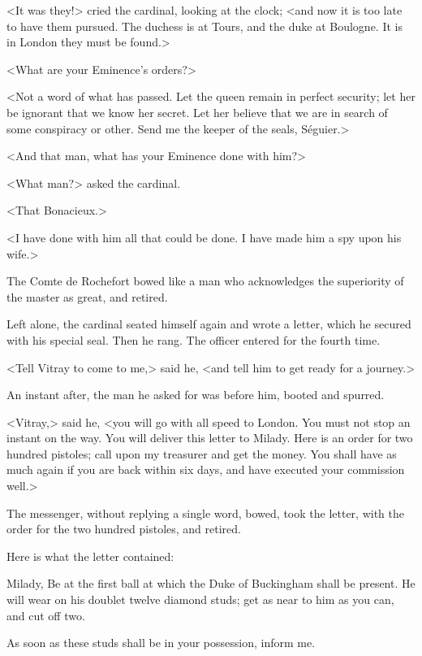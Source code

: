 <It was they!> cried the cardinal, looking at the clock; <and now it is too late to have them pursued. The duchess is at Tours, and the duke at Boulogne. It is in London they must be found.> 

<What are your Eminence's orders?> 

<Not a word of what has passed. Let the queen remain in perfect security; let her be ignorant that we know her secret. Let her believe that we are in search of some conspiracy or other. Send me the keeper of the seals, Séguier.> 

<And that man, what has your Eminence done with him?> 

<What man?> asked the cardinal. 

<That Bonacieux.> 

<I have done with him all that could be done. I have made him a spy upon his wife.> 

The Comte de Rochefort bowed like a man who acknowledges the superiority of the master as great, and retired. 

Left alone, the cardinal seated himself again and wrote a letter, which he secured with his special seal. Then he rang. The officer entered for the fourth time. 

<Tell Vitray to come to me,> said he, <and tell him to get ready for a journey.> 

An instant after, the man he asked for was before him, booted and spurred. 

<Vitray,> said he, <you will go with all speed to London. You must not stop an instant on the way. You will deliver this letter to Milady. Here is an order for two hundred pistoles; call upon my treasurer and get the money. You shall have as much again if you are back within six days, and have executed your commission well.> 

The messenger, without replying a single word, bowed, took the letter, with the order for the two hundred pistoles, and retired. 

Here is what the letter contained: 

\begin{mail}{}{Milady,} 
Be at the first ball at which the Duke of Buckingham shall be present. He will wear on his doublet twelve diamond studs; get as near to him as you can, and cut off two. 

As soon as these studs shall be in your possession, inform me. 
\end{mail}